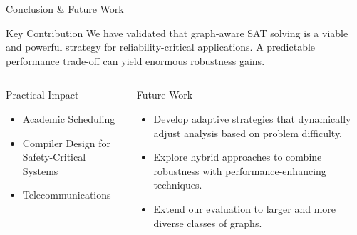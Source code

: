 \documentclass[11pt]{beamer}
\begin{document}
\begin{frame}{Conclusion \& Future Work}
    \begin{block}{Key Contribution}
        We have validated that graph-aware SAT solving is a viable and powerful strategy for reliability-critical applications. A predictable performance trade-off can yield enormous robustness gains.
    \end{block}
    \begin{columns}[T]
        \begin{column}{0.5\textwidth}
            \begin{exampleblock}{Practical Impact}
                \begin{itemize}
                    \item Academic Scheduling
                    \item Compiler Design for Safety-Critical Systems
                    \item Telecommunications
                \end{itemize}
            \end{exampleblock}
        \end{column}
        \begin{column}{0.5\textwidth}
            \begin{block}{Future Work}
                \begin{itemize}
                    \item Develop adaptive strategies that dynamically adjust analysis based on problem difficulty.
                    \item Explore hybrid approaches to combine robustness with performance-enhancing techniques.
                    \item Extend our evaluation to larger and more diverse classes of graphs.
                \end{itemize}
            \end{block}
        \end{column}
    \end{columns}
\end{frame}
\end{document}
